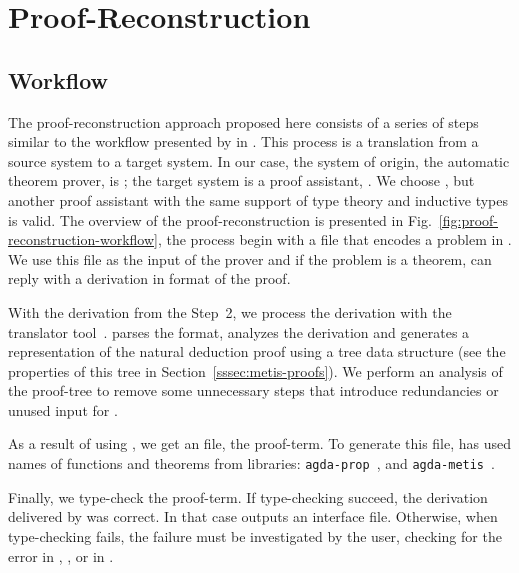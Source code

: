 \documentclass[../main.tex]{subfiles}
\begin{document}

\section{Proof-Reconstruction}
\label{sec:proof-reconstruction}

\subsection{Workflow}
\label{ssec:workflow}



The proof-reconstruction approach proposed here consists of a series
of steps similar to the workflow presented by \citeauthor{sultana2015} in
\cite{sultana2015}. This process is a translation from a source
system to a target system. In our case, the system of origin, the
automatic theorem prover, is \Metis; the target system is a proof
assistant, \Agda. We choose \Agda, but another proof assistant with the same
support of type theory and inductive types is valid.
The overview of the proof-reconstruction is presented in
Fig.~\ref{fig:proof-reconstruction-workflow}, the process begin with
a \TPTP file that encodes a problem in \CPL. We use this file as the
input of the \Metis prover and if the problem is a theorem, \Metis can reply
with a derivation in \TSTP format of the proof.

With the \TSTP  derivation from the Step~2, we process the derivation with the
\Athena translator tool~\cite{Athena}.
\Athena parses the \TSTP format, analyzes the
derivation and generates a representation of the natural deduction
proof using a tree data structure (see the properties
of this tree in Section~\ref{sssec:metis-proofs}).
We perform an analysis of the proof-tree to remove some
unnecessary steps that introduce redundancies or unused input for
\Athena.

As a result of using \Athena, we get an \Agda file, the proof-term. To
generate this file, \Athena has used names of functions and theorems from
\Agda libraries:
\texttt{agda-prop}~\cite{AgdaProp}, and \texttt{agda-metis}~\cite{AgdaMetis}.


Finally, we type-check the \Agda proof-term. If type-checking
succeed, the \TSTP derivation delivered by \Metis was correct.
In that case \Agda outputs an interface file.
Otherwise, when type-checking fails, the failure must be
investigated by the user, checking for the error in \Metis, \Athena,
or in \Agda.
\end{document}
